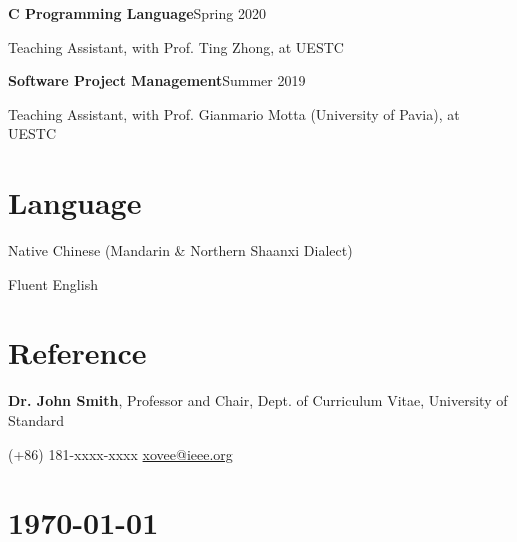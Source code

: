 \documentclass{article}
\begin{document}
\textbf{C Programming Language}\hfill Spring 2020

\hspace{2em}Teaching Assistant, with Prof. Ting Zhong, at UESTC

\textbf{Software Project Management}\hfill Summer 2019

\hspace{2em}Teaching Assistant, with Prof. Gianmario Motta (University of Pavia), at UESTC














\section*{Language}
\indent

Native Chinese (Mandarin \& Northern Shaanxi Dialect)

Fluent English




\section*{Reference}
\indent

\textbf{Dr. John Smith}, Professor and Chair, Dept. of Curriculum Vitae, University of Standard

\hspace{2em}(+86) 181-xxxx-xxxx \hspace{2em} \url{xovee@ieee.org}


\vfill

\section*{\hfill\color{OliveGreen}\today}
\end{document}
